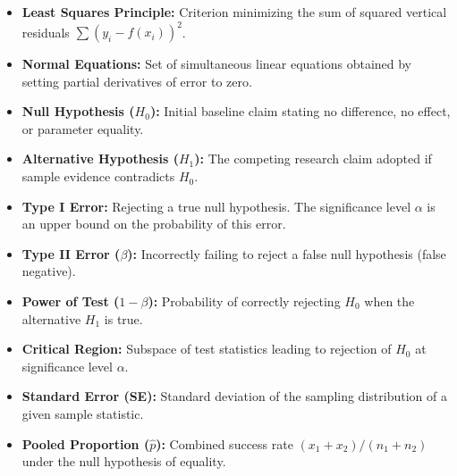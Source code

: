 \documentclass[12pt,a4paper]{article}
\begin{document}
\begin{tcolorbox}[defbox, title={\textbf{One-Line Definitions}}]
\begin{itemize}[leftmargin=*, itemsep=2pt, topsep=0pt, parsep=0pt]
  \item \textbf{Least Squares Principle:} Criterion minimizing the sum of squared vertical residuals $\sum (y_i - f(x_i))^2$.
  \item \textbf{Normal Equations:} Set of simultaneous linear equations obtained by setting partial derivatives of error to zero.
  \item \textbf{Null Hypothesis ($H_0$):} Initial baseline claim stating no difference, no effect, or parameter equality.
  \item \textbf{Alternative Hypothesis ($H_1$):} The competing research claim adopted if sample evidence contradicts $H_0$.
  \item \textbf{Type I Error:} Rejecting a true null hypothesis. The significance level $\alpha$ is an upper bound on the probability of this error.
  \item \textbf{Type II Error ($\beta$):} Incorrectly failing to reject a false null hypothesis (false negative).
  \item \textbf{Power of Test ($1 - \beta$):} Probability of correctly rejecting $H_0$ when the alternative $H_1$ is true.
  \item \textbf{Critical Region:} Subspace of test statistics leading to rejection of $H_0$ at significance level $\alpha$.
  \item \textbf{Standard Error (SE):} Standard deviation of the sampling distribution of a given sample statistic.
  \item \textbf{Pooled Proportion ($\hat{p}$):} Combined success rate $(x_1+x_2)/(n_1+n_2)$ under the null hypothesis of equality.
\end{itemize}
\end{tcolorbox}
\end{document}
